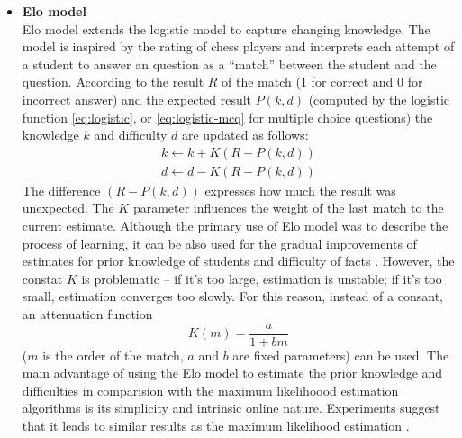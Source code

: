 \documentclass[a4paper, 12pt, twoside]{fithesis2}		%
\renewcommand{\_}{\leavevmode \kern0.07em\vbox{\hrule width0.4em}}
\newcommand{\squarebullet}{\textcolor{black}{\raisebox{0.15em}{\rule{4pt}{4pt}}}}
\newcommand{\emptysquarebullet}{\textcolor{black}{\raisebox{0.10em}{\tiny$\square$}}}
\newenvironment{myItemize}{
  \begin{itemize}[leftmargin=2em,rightmargin=1em,itemsep=\parskip ,parsep=0em,topsep=0em,partopsep=0em]
  \renewcommand{\labelitemi}{\squarebullet}
  \renewcommand{\labelitemii}{\textbullet}
}{
  \end{itemize}
}
\newcounter{choice}
\begin{document}
\begin{myItemize}
\item \textbf{Elo model}\\
  Elo model extends the logistic model to capture changing knowledge.
  The model is inspired by the rating of chess players \cite{elo-rating} and interprets each attempt of a student to answer an question as a ``match'' between the student and the question.
  According to the result $R$ of the match (1 for correct and 0 for incorrect answer)
  and the expected result $P(k, d)$
  (computed by the logistic function \ref{eq:logistic}, or \ref{eq:logistic-mcq} for multiple choice questions)
  the knowledge $k$ and difficulty $d$ are updated as follows:
  \begin{equation}\label{eq:elo}
  \begin{array}{l}
      k \gets k + K (R - P(k, d))\\
      d \gets d - K (R - P(k, d))
  \end{array}
  \end{equation}
The difference $(R - P(k, d))$ expresses how much the result was unexpected.
The $K$ parameter influences the weight of the last match to the current estimate.
Although the primary use of Elo model was to describe the process of learning,
it can be also used for the gradual improvements of estimates for prior knowledge of students and difficulty of facts \cite{slepe-mapy}.
However, the constat $K$ is problematic -- if it's too large, estimation is unstable; if it's too small, estimation converges too slowly.
For this reason, instead of a consant, an attenuation function
\begin{equation}\label{eq:attenuation}
  K(m) = \frac{a}{1 + bm}
\end{equation}
($m$ is the order of the match, $a$ and $b$ are fixed parameters) can be used.
The main advantage of using the Elo model to estimate the prior knowledge and difficulties in comparision with the maximum likelihoood estimation algorithms is its simplicity and intrinsic online nature.
Experiments suggest that it leads to similar results as the maximum likelihood estimation \cite{slepe-mapy-time-elo}.


\end{myItemize}
\end{document}
